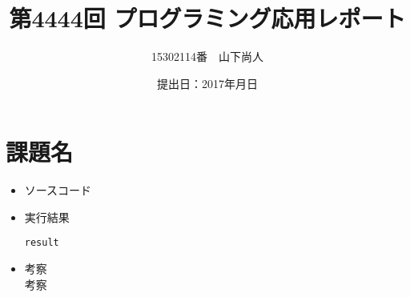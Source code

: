 \documentclass[a4paper]{jsarticle}
\title{第4444回 プログラミング応用レポート}
\author{15302114番　山下尚人}
\date{提出日：2017年月日}
\begin{document}
\maketitle%

\section{課題名}
	\begin{itemize}
	\item ソースコード
	\item 実行結果
		\begin{lstlisting}
result
		\end{lstlisting}
		\mbox{}\newline
	\item 考察\mbox{}\\
		考察
	\end{itemize}
	\newpage	%
\end{document}
